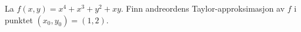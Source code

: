 

\oppgave[K2016, Oppgave 3] La $f(x, y) = x^4 + x^3 + y^2 + xy$. Finn andreordens
Taylor-approksimasjon av $f$ i punktet $(x_0, y_0) = (1, 2)$.
  